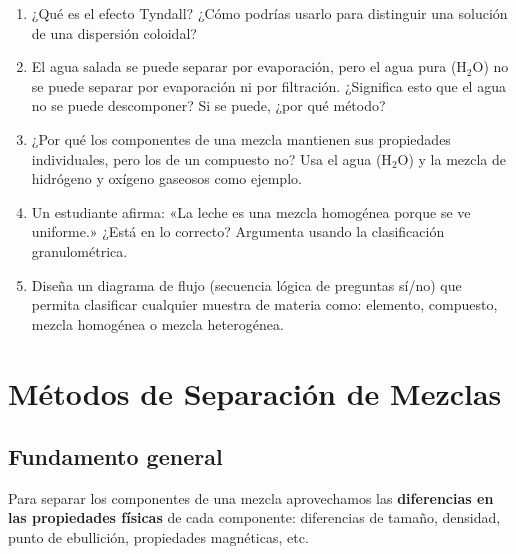 \documentclass[12pt, a4paper]{article}
\begin{document}
\begin{enumerate}[leftmargin=*, resume]
  \item \medio{} ¿Qué es el efecto Tyndall? ¿Cómo podrías usarlo para distinguir una solución de una dispersión coloidal?

  \item \dificil{} El agua salada se puede separar por evaporación, pero el agua pura (H$_2$O) no se puede separar por evaporación ni por filtración. ¿Significa esto que el agua no se puede descomponer? Si se puede, ¿por qué método?

  \item \dificil{} ¿Por qué los componentes de una mezcla mantienen sus propiedades individuales, pero los de un compuesto no? Usa el agua (H$_2$O) y la mezcla de hidrógeno y oxígeno gaseosos como ejemplo.

  \item \dificil{} Un estudiante afirma: «La leche es una mezcla homogénea porque se ve uniforme.» ¿Está en lo correcto? Argumenta usando la clasificación granulométrica.

  \item \dificil{} Diseña un diagrama de flujo (secuencia lógica de preguntas sí/no) que permita clasificar cualquier muestra de materia como: elemento, compuesto, mezcla homogénea o mezcla heterogénea.
\end{enumerate}

\newpage

\section{Métodos de Separación de Mezclas}

\subsection{Fundamento general}

Para separar los componentes de una mezcla aprovechamos las \textbf{diferencias en las propiedades físicas} de cada componente: diferencias de tamaño, densidad, punto de ebullición, propiedades magnéticas, etc.
\end{document}

